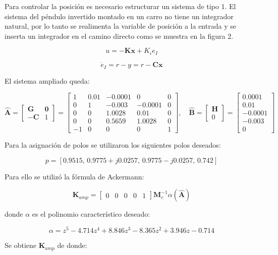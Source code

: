 Para controlar la posición es necesario estructurar un sistema de tipo 1. El sistema del péndulo invertido montado en un carro no tiene un integrador natural, por lo tanto se realimenta la variable de posición a la entrada y se inserta un integrador en el camino directo como se muestra en la figura 2.

\[
u = -\mathbf{K}\mathbf{x} + K_i e_I
\]

\[
\dot{e}_I = r - y = r - \mathbf{C}\mathbf{x}
\]

El sistema ampliado queda:

\[
\hat{\mathbf{A}} = \begin{bmatrix} \mathbf{G} & \mathbf{0} \\ -\mathbf{C} & 1 \end{bmatrix} = \begin{bmatrix} 1 & 0.01 & -0.0001 & 0 & 0 \\ 0 & 1 & -0.003 & -0.0001 & 0 \\ 0 & 0 & 1.0028 & 0.01 & 0 \\ 0 & 0 & 0.5659 & 1.0028 & 0 \\ -1 & 0 & 0 & 0 & 1 \end{bmatrix}, \quad \hat{\mathbf{B}} = \begin{bmatrix} \mathbf{H} \\ 0 \end{bmatrix} = \begin{bmatrix} 0.0001 \\ 0.01 \\ -0.0001 \\ -0.003 \\ 0 \end{bmatrix}
\]

Para la asignación de polos se utilizaron los siguientes polos deseados:

\[
p = [0.9515, \, 0.9775 + j0.0257, \, 0.9775 - j0.0257, \, 0.742]
\]

Para ello se utilizó la fórmula de Ackermann:

\[
\mathbf{K}_{amp} = \begin{bmatrix} 0 & 0 & 0 & 0 & 1 \end{bmatrix} \mathbf{M}_c^{-1} \alpha(\hat{\mathbf{A}})
\]

donde $\alpha$ es el polinomio característico deseado:

\[
\alpha = z^5 - 4.714 z^4 + 8.846 z^3 - 8.365 z^2 + 3.946 z - 0.714
\]

Se obtiene $\mathbf{K}_{amp}$  de donde:

